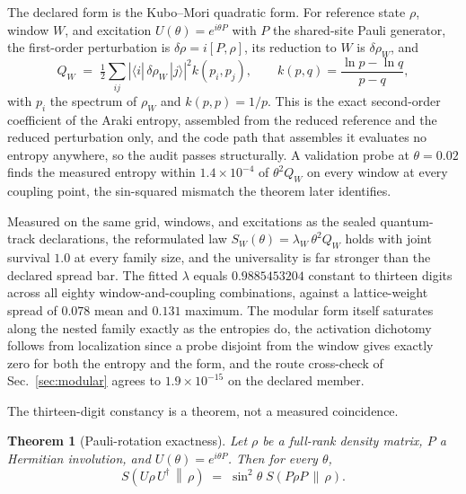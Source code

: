 \documentclass[aps,prd,reprint,nofootinbib,longbibliography]{revtex4-2}
\newtheorem{theorem}{Theorem}
\begin{document}
The declared form is the Kubo--Mori quadratic form.  For reference
state $\rho$, window $W$, and excitation $U(\theta) = e^{i\theta P}$
with $P$ the shared-site Pauli generator, the first-order
perturbation is $\delta\rho = i[P,\rho]$, its reduction to $W$ is
$\delta\rho_W$, and
\begin{equation}
Q_W \;=\; \tfrac{1}{2} \sum_{ij}
  \left|\langle i|\,\delta\rho_W\,|j\rangle\right|^2 k(p_i,p_j),
\qquad
k(p,q) = \frac{\ln p - \ln q}{p - q},
\label{eq:kubomori}
\end{equation}
with $p_i$ the spectrum of $\rho_W$ and $k(p,p) = 1/p$.  This is the
exact second-order coefficient of the Araki entropy, assembled from
the reduced reference and the reduced perturbation only, and the
code path that assembles it evaluates no entropy anywhere, so the
audit passes structurally.  A validation probe at $\theta = 0.02$
finds the measured entropy within $1.4\times 10^{-4}$ of
$\theta^2 Q_W$ on every window at every coupling point, the
sin-squared mismatch the theorem later identifies.

Measured on the same grid, windows, and excitations as the sealed
quantum-track declarations, the reformulated law
$S_W(\theta) = \lambda_W\,\theta^2 Q_W$ holds with joint survival
$1.0$ at every family size, and the universality is far stronger
than the declared spread bar.  The fitted $\lambda$ equals
$0.9885453204$ constant to thirteen digits across all eighty
window-and-coupling combinations, against a lattice-weight spread of
$0.078$ mean and $0.131$ maximum.  The modular form itself saturates
along the nested family exactly as the entropies do, the activation
dichotomy follows from localization since a probe disjoint from the
window gives exactly zero for both the entropy and the form, and the
route cross-check of Sec.~\ref{sec:modular} agrees to
$1.9\times 10^{-15}$ on the declared member.

The thirteen-digit constancy is a theorem, not a measured
coincidence.

\begin{theorem}[Pauli-rotation exactness]
Let $\rho$ be a full-rank density matrix, $P$ a Hermitian involution,
and $U(\theta) = e^{i\theta P}$.  Then for every $\theta$,
\begin{equation}
S\!\left(U\rho\,U^{\dagger} \,\middle\|\, \rho\right)
 \;=\; \sin^2\!\theta \; S\!\left(P\rho P \,\middle\|\, \rho\right).
\label{eq:exactness}
\end{equation}
\end{theorem}
\end{document}
